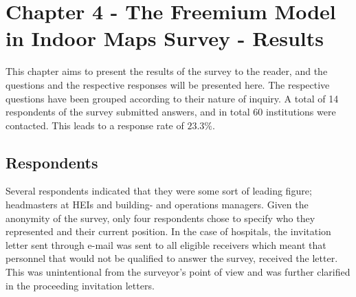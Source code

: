 \chapter{Chapter 4 - The Freemium Model in Indoor Maps Survey - Results}
This chapter aims to present the results of the survey to the reader, and the questions and the respective responses will be presented here. The respective questions have been grouped according to their nature of inquiry.
A total of 14 respondents of the survey submitted answers, and in total 60 institutions were contacted. This leads to a response rate of $23.3\%$. 
\section{Respondents}
Several respondents indicated that they were some sort of leading figure; headmasters at HEIs and building- and operations managers. Given the anonymity of the survey, only four respondents chose to specify who they represented and their current position. In the case of hospitals, the invitation letter sent through e-mail was sent to all eligible receivers which meant that personnel that would not be qualified to answer the survey, received the letter. This was unintentional from the surveyor's point of view and was further clarified in the proceeding invitation letters.

